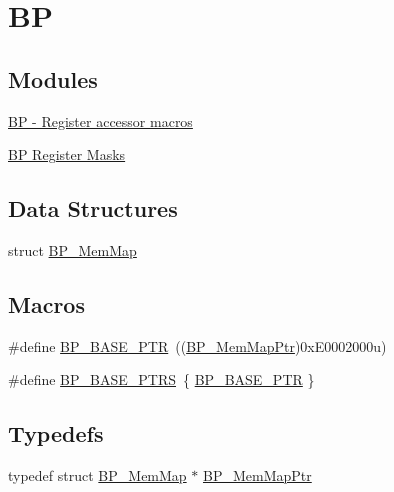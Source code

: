 \hypertarget{group___b_p___peripheral}{}\section{B\+P}
\label{group___b_p___peripheral}
\subsection*{Modules}
\begin{DoxyCompactItemize}
\item 
\hyperlink{group___b_p___register___accessor___macros}{B\+P -\/ Register accessor macros}
\item 
\hyperlink{group___b_p___register___masks}{B\+P Register Masks}
\end{DoxyCompactItemize}
\subsection*{Data Structures}
\begin{DoxyCompactItemize}
\item 
struct \hyperlink{struct_b_p___mem_map}{B\+P\+\_\+\+Mem\+Map}
\end{DoxyCompactItemize}
\subsection*{Macros}
\begin{DoxyCompactItemize}
\item 
\#define \hyperlink{group___b_p___peripheral_ga375cd6d2e7ec414f4e33cb54d5494940}{B\+P\+\_\+\+B\+A\+S\+E\+\_\+\+P\+T\+R}~((\hyperlink{group___b_p___peripheral_gaa250950ffe336f8c6e5895e3a1e4ca86}{B\+P\+\_\+\+Mem\+Map\+Ptr})0x\+E0002000u)
\item 
\#define \hyperlink{group___b_p___peripheral_ga6c07114ad41ccb42b134e8834f123598}{B\+P\+\_\+\+B\+A\+S\+E\+\_\+\+P\+T\+R\+S}~\{ \hyperlink{group___b_p___peripheral_ga375cd6d2e7ec414f4e33cb54d5494940}{B\+P\+\_\+\+B\+A\+S\+E\+\_\+\+P\+T\+R} \}
\end{DoxyCompactItemize}
\subsection*{Typedefs}
\begin{DoxyCompactItemize}
\item 
typedef struct \hyperlink{struct_b_p___mem_map}{B\+P\+\_\+\+Mem\+Map} $\ast$ \hyperlink{group___b_p___peripheral_gaa250950ffe336f8c6e5895e3a1e4ca86}{B\+P\+\_\+\+Mem\+Map\+Ptr}
\end{DoxyCompactItemize}


